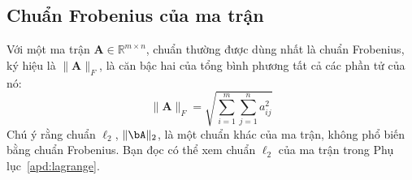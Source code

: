 \subsection{Chuẩn Frobenius của ma trận}
Với một ma trận $\mathbf{A} \in \mathbb{R}^{m\times n}$, chuẩn thường được dùng
nhất là chuẩn Frobenius, ký hiệu là $\|\mathbf{A}\|_F$, là căn bậc hai của tổng
bình phương tất cả các phần tử của nó:
\begin{equation*}
\|\mathbf{A}\|_F = \sqrt{\sum_{i = 1}^m \sum_{j = 1}^n a_{ij}^2}
\end{equation*}
Chú ý rằng chuẩn $\ell_2$, $\|\bA\|_2$, là một chuẩn khác của ma trận, không phổ biến bằng
chuẩn Frobenius. Bạn đọc có thể xem chuẩn $\ell_2$ của ma trận trong Phụ lục~\ref{apd:lagrange}.





